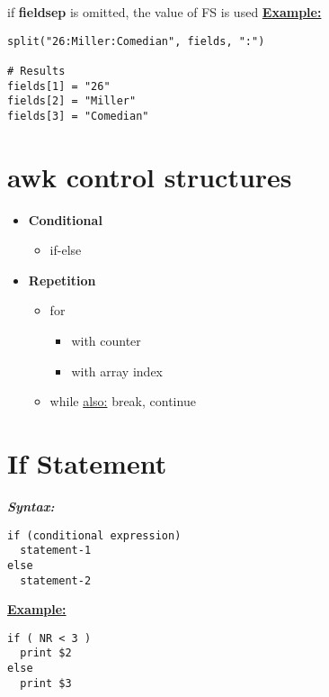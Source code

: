 \documentclass{report}
\begin{document}
\noindent if \textbf{fieldsep} is omitted, the value of FS is used
\bigbreak \noindent
\textbf{\underline{Example:}}
\begin{mdframed}
\begin{verbatim}
split("26:Miller:Comedian", fields, ":")

# Results
fields[1] = "26"
fields[2] = "Miller"
fields[3] = "Comedian"
\end{verbatim}
\end{mdframed}
\newpage
\section{awk control structures}
\begin{itemize}
  \item \textbf{Conditional} 
    \begin{itemize}[label=$\circ$]
      \item if-else 
    \end{itemize}
  \item \textbf{Repetition}
    \begin{itemize}[label=$\circ$]
      \item for 
        \begin{itemize}
          \item with counter 
          \item with array index
        \end{itemize}
      \item while
        \subitem \underline{also:} break, continue
    \end{itemize}
\end{itemize}
\section{If Statement}
\bigbreak \noindent
\textbf{\textit{Syntax:}}
\begin{verbatim}
if (conditional expression)
  statement-1
else
  statement-2
\end{verbatim}
\bigbreak \noindent
\textbf{\underline{Example:}}
\begin{verbatim}
if ( NR < 3 )
  print $2
else
  print $3
\end{verbatim}
\end{document}
